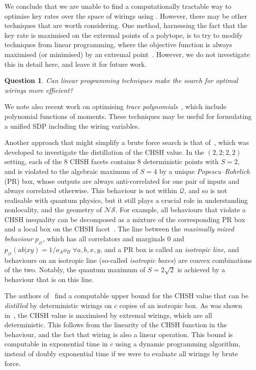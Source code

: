 \documentclass[10pt, a4paper]{article}
\numberwithin{equation}{section} %
\theoremstyle{definition}
\theoremstyle{plain}
\newtheorem{question}{Question}
\newcommand{\?}{\mathrel{?}} %
\newcommand{\Qs}{\mathcal{Q}}
\newcommand{\NSs}{\mathcal{NS}}
\begin{document}
                  We conclude that we are unable to find a computationally tractable way to optimise key rates over the space of wirings using . However, there may be other techniques that are worth considering. One method, harnessing the fact that the key rate is maximised on the extremal points of a polytope, is to try to modify techniques from linear programming, where the objective function is always maximised (or minimised) by an extremal point~\cite{LuenbergerYe}. However, we do not investigate this in detail here, and leave it for future work.
                  \begin{question}
                    Can linear programming techniques make the search for optimal wirings more efficient?
                  \end{question}
                  We note also recent work on optimising \emph{trace polynomials}~\cite{TracePolyOpt}, which include polynomial functions of moments. These techniques may be useful for formulating a unified SDP including the wiring variables.

                    Another approach that might simplify a brute force search is that of~\cite{DistillationBounds}, which was developed to investigate the distillation of the CHSH value. In the \((2,2;2,2)\) setting, each of the 8 CHSH facets contains 8 deterministic points with \(S = 2\), and is violated to the algebraic maximum of \(S = 4\) by a unique \emph{Popescu–Rohrlich} (PR) box, whose outputs are always anti-correlated for one pair of inputs and always correlated otherwise. This behaviour is not within \(\Qs\), and so is not realisable with quantum physics, but it still plays a crucial role in understanding nonlocality, and the geometry of \(\NSs\). For example, all behaviours that violate a CHSH inequality can be decomposed as a mixture of the corresponding PR box and a local box on the CHSH facet~\cite{GeomDecomp}. The line between the \emph{maximally mixed behaviour} \(p_{\varnothing}\), which has all correlators and marginals 0 and \(p_{\varnothing}(ab|xy) = 1/o_A o_B\; \forall a,b,x,y\), and a PR box is called an \emph{isotropic line}, and behaviours on an isotropic line (so-called \emph{isotropic boxes}) are convex combinations of the two. Notably, the quantum maximum of \(S = 2\sqrt{2}\) is achieved by a behaviour that is on this line.

                    The authors of~\cite{DistillationBounds} find a computable upper bound for the CHSH value that can be \emph{distilled} by deterministic wirings on \(c\) copies of an isotropic box. As was shown in~\cite{JanLiThesis}, the CHSH value is maximised by extremal wirings, which are all deterministic. This follows from the linearity of the CHSH function in the behaviour, and the fact that wiring is also a linear operation. This bound is computable in exponential time in \(c\) using a dynamic programming algorithm, instead of doubly exponential time if we were to evaluate all wirings by brute force.
\end{document}
